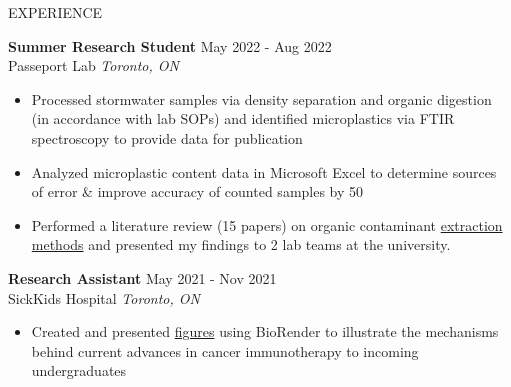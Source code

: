 \documentclass{resume} %
\begin{document}
\begin{rSection}{EXPERIENCE}

\textbf{Summer Research Student} \hfill May 2022 - Aug 2022\\
Passeport Lab \hfill \textit{Toronto, ON}
\vspace{-0.2cm}
 \begin{itemize}
    \itemsep -8pt {} 
    \item Processed stormwater samples via density separation and organic digestion (in accordance with lab SOPs) and identified microplastics via FTIR spectroscopy to provide data for publication 
    \item Analyzed microplastic content data in Microsoft Excel to determine sources of error & improve accuracy of counted samples by 50%
    \item Performed a literature review (15 papers) on organic contaminant \href{https://drive.google.com/file/d/1tVPh5Zt4zLT8spiLfzJ4vu0XZSuMfOfu/view}{extraction methods} and presented my findings to 2 lab teams at the university. 

 \end{itemize}
 
\textbf{Research Assistant} \hfill May 2021 - Nov 2021\\
SickKids Hospital \hfill \textit{Toronto, ON}
\vspace{-0.2cm}
 \begin{itemize}
    \itemsep -8pt {} 
     \item Created and presented \href{https://drive.google.com/file/d/1459llsxjfB4-UA4sHfnBQ7wem0znVUL5/view?usp=sharing}{figures} using BioRender to illustrate the mechanisms behind current advances in cancer immunotherapy to incoming undergraduates
 \end{itemize}


\end{rSection}
\end{document}

